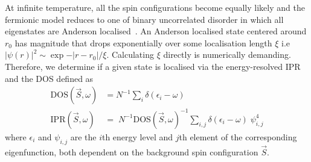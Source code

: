 At infinite temperature, all the spin configurations become equally likely and the fermionic model reduces to one of binary uncorrelated disorder in which all eigenstates are Anderson localised~\autocite{abrahamsScalingTheoryLocalization1979}. An Anderson localised state centered around \(r_0\) has magnitude that drops exponentially over some localisation length \(\xi\) i.e \(|\psi(r)|^2 \sim \exp{-|r - r_0|/\xi}\). Calculating \(\xi\) directly is numerically demanding. Therefore, we determine if a given state is localised via the energy-resolved IPR and the DOS defined as \[\begin{aligned}
\mathrm{DOS}(\vec{S}, \omega)& = N^{-1} \sum_{i} \delta(\epsilon_i - \omega)\\
\mathrm{IPR}(\vec{S}, \omega)& = \; N^{-1} \mathrm{DOS}(\vec{S}, \omega)^{-1} \sum_{i,j} \delta(\epsilon_i - \omega)\;\psi^{4}_{i,j}\end{aligned}\] where \(\epsilon_i\) and \(\psi_{i,j}\) are the \(i\)th energy level and \(j\)th element of the corresponding eigenfunction, both dependent on the background spin configuration \(\vec{S}\).

